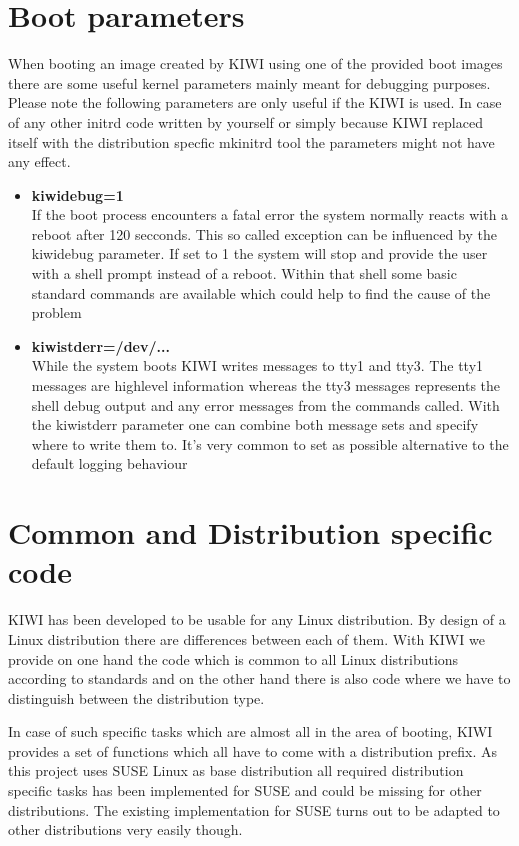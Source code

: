 \section{Boot parameters}
When booting an image created by KIWI using one of the provided
boot images there are some useful kernel parameters mainly meant
for debugging purposes. Please note the following parameters are
only useful if the KIWI  is used. In case of any other
initrd code written by yourself or simply because KIWI replaced
itself with the distribution specfic mkinitrd tool the parameters
might not have any effect.

\begin{itemize}
\item \textbf{kiwidebug=1}\\
      If the boot process encounters a fatal error the system normally
      reacts with a reboot after 120 secconds. This so called exception
      can be influenced by the kiwidebug parameter. If set to 1 the system
      will stop and provide the user with a shell prompt instead of a
      reboot. Within that shell some basic standard commands are
      available which could help to find the cause of the problem
\item \textbf{kiwistderr=/dev/...}\\
      While the system boots KIWI writes messages to tty1 and tty3. The
      tty1 messages are highlevel information whereas the tty3 messages
      represents the shell debug output and any error messages from
      the commands called. With the kiwistderr parameter one can combine
      both message sets and specify where to write them to. It's very
      common to set  as possible alternative to the default
      logging behaviour
\end{itemize}

\section{Common and Distribution specific code}
KIWI has been developed to be usable for any Linux distribution.
By design of a Linux distribution there are differences between
each of them. With KIWI we provide on one hand the code which
is common to all Linux distributions according to standards and
on the other hand there is also code where we have to distinguish
between the distribution type.

In case of such specific tasks which are almost all in the area
of booting, KIWI provides a set of functions which all have to come
with a distribution prefix. As this project uses SUSE Linux as
base distribution all required distribution specific tasks has been
implemented for SUSE and could be missing for other distributions.
The existing implementation for SUSE turns out to be adapted to other
distributions very easily though.

